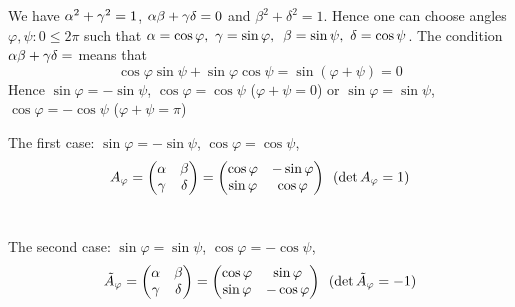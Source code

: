 \documentclass[12pt]{article}
\numberwithin{equation}{section}
\begin{document}
 We have  $\alpha^2+\gamma^2=1$, $\alpha\beta+\gamma\delta=0$ and $\beta^2+\delta^2=1$.  Hence one can choose angles
  $\varphi,\psi \colon 0\leq 2\pi$ such that
               $\alpha=\cos\varphi,\,\,\gamma=\sin\varphi,\,\,\,\beta=\sin\psi,\,\,\delta=\cos\psi$.
 The condition  $\alpha\beta+\gamma\delta=$ means that
                 $$
            \cos\varphi\sin\psi+ \sin\varphi\cos\psi=\sin(\varphi+\psi)=0
                 $$
Hence $\sin \varphi=-\sin \psi$, $\cos\varphi=\cos\psi$ ($\varphi+\psi=0$) or
$\sin \varphi=\sin \psi$, $\cos\varphi=-\cos\psi$ ($\varphi+\psi=\pi$)


The first case:  $\sin \varphi=-\sin \psi$, $\cos\varphi=\cos\psi$,
   \begin{equation}\label{orthogonalrotation}
    A_\varphi=\begin{pmatrix}
      \alpha & \beta \\
      \gamma & \delta\\
       \end{pmatrix}=\begin{pmatrix}
      \cos\varphi & -\sin\varphi \\
      \sin\varphi & \cos\varphi\\
       \end{pmatrix}\,\,\,(\det A_\varphi=1)
\end{equation}\

 The second case: $\sin \varphi=\sin \psi$, $\cos\varphi=-\cos\psi$,
   \begin{equation}\label{orthogonalrotation+reflection}
    \tilde A_\varphi=\begin{pmatrix}
      \alpha & \beta \\
      \gamma & \delta\\
       \end{pmatrix}=\begin{pmatrix}
      \cos\varphi & \sin\varphi \\
      \sin\varphi & -\cos\varphi\\
       \end{pmatrix}\,\,\, (\det \tilde A_\varphi=-1)
\end{equation}
\end{document}
